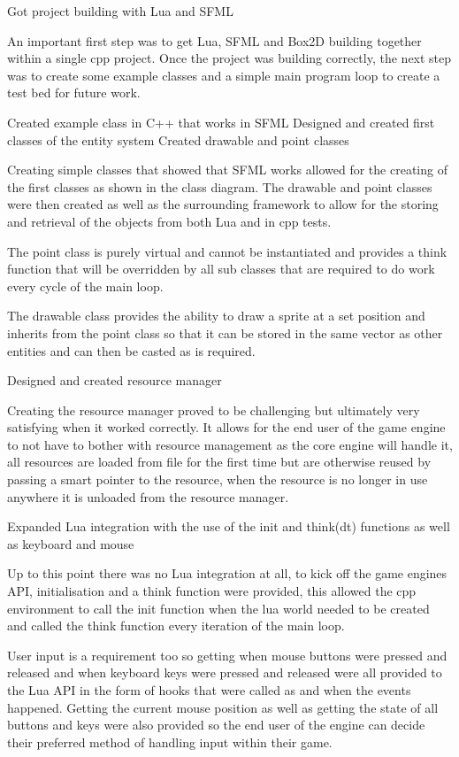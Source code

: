 \documentclass[11pt,a4paper,titlepage]{article}
\begin{document}
    
Got project building with Lua and SFML
    
    An important first step was to get Lua, SFML and Box2D building together within a single cpp project. Once the project was building correctly, the next step was to create some example classes and a simple main program loop to create a test bed for future work.

Created example class in C++ that works in SFML
Designed and created first classes of the entity system
Created drawable and point classes
    
    Creating simple classes that showed that SFML works allowed for the creating of the first classes as shown in the class diagram. The drawable and point classes were then created as well as the surrounding framework to allow for the storing and retrieval of the objects from both Lua and in cpp tests.

    The point class is purely virtual and cannot be instantiated and provides a think function that will be overridden by all sub classes that are required to do work every cycle of the main loop.

    The drawable class provides the ability to draw a sprite at a set position and inherits from the point class so that it can be stored in the same vector as other entities and can then be casted as is required.

Designed and created resource manager

    Creating the resource manager proved to be challenging but ultimately very satisfying when it worked correctly. It allows for the end user of the game engine to not have to bother with resource management as the core engine will handle it, all resources are loaded from file for the first time but are otherwise reused by passing a smart pointer to the resource, when the resource is no longer in use anywhere it is unloaded from the resource manager.

Expanded Lua integration with the use of the init and think(dt) functions as well as  keyboard and mouse 

    Up to this point there was no Lua integration at all, to kick off the game engines API, initialisation and a think function were provided, this allowed the cpp environment to call the init function when the lua world needed to be created and called the think function every iteration of the main loop.

    User input is a requirement too so getting when mouse buttons were pressed and released and when keyboard keys were pressed and released were all provided to the Lua API in the form of hooks that were called as and when the events happened. Getting the current mouse position as well as getting the state of all buttons and keys were also provided so the end user of the engine can decide their preferred method of handling input within their game.
\end{document}
